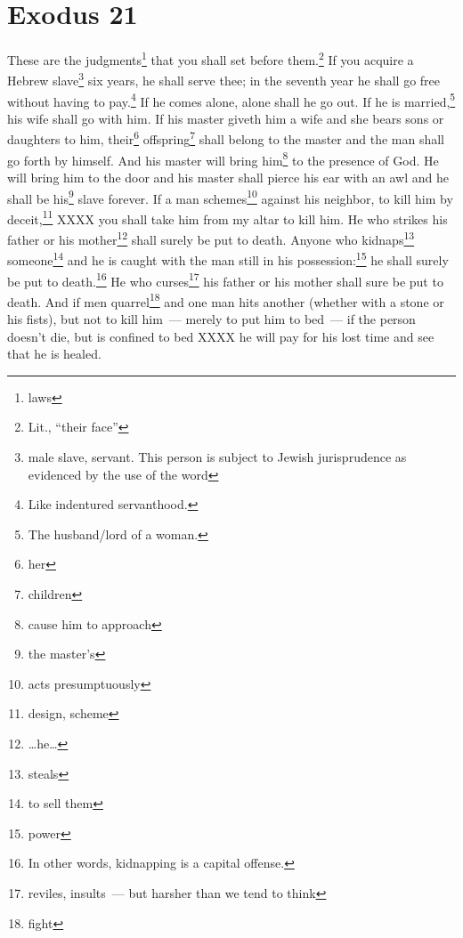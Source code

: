 \section{Exodus 21}\label{Exodus 21}
\begin{enumerate}[align=center]
     These are the judgments\footnote{laws} that you shall set before them.\footnote{Lit., ``their face''}%
     If you acquire a Hebrew slave\footnote{male slave, servant. This person is subject to Jewish jurisprudence as evidenced by the use of the word } six years, he shall serve thee; in the seventh year he shall go free without having to pay.\footnote{Like indentured servanthood.}%
     If he comes alone, alone shall he go out. If he is married,\footnote{The husband/lord of a woman.} his wife shall go with him.%
     If his master giveth him a wife and she bears sons or daughters to him, their\footnote{her} offspring\footnote{children} shall belong to the master and the man shall go forth by himself.%
     And his master will bring him\footnote{cause him to approach} to the presence of God. He will bring him to the door and his master shall pierce his ear with an awl and he shall be his\footnote{the master's} slave forever.%
     If a man schemes\footnote{acts presumptuously} against his neighbor, to kill him by deceit,\footnote{design, scheme} XXXX you shall take him from my altar to kill him.%
     He who strikes his father or his mother\footnote{\dots he\dots} shall surely be put to death.%
     Anyone who kidnaps\footnote{steals} someone\footnote{to sell them} and he is caught with the man still in his possession:\footnote{power} he shall surely be put to death.\footnote{In other words, kidnapping is a capital offense.}%
     He who curses\footnote{reviles, insults~--- but harsher than we tend to think} his father or his mother shall sure be put to death.%
     And if men quarrel\footnote{fight} and one man hits another (whether with a stone or his fists), but not to kill him~--- merely to put him to bed~---%
     if the person doesn't die, but is confined to bed XXXX he will pay for his lost time and see that he is healed.%

\end{enumerate}

